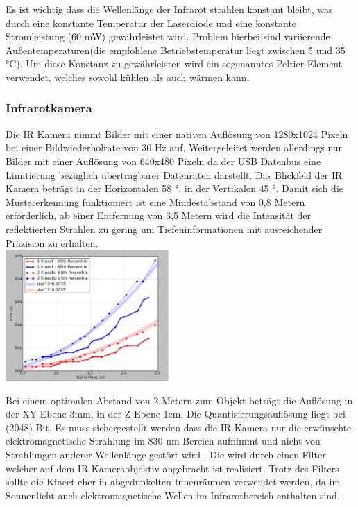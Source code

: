 Es ist wichtig dass die Wellenlänge der Infrarot strahlen konstant bleibt, was durch eine konstante Temperatur der Laserdiode und eine konstante Stromleistung (60 mW) gewährleistet wird. Problem hierbei sind variierende Außentemperaturen(die empfohlene Betriebstemperatur  liegt zwischen 5 und 35 °C). Um diese Konstanz zu gewährleisten wird ein sogenanntes  Peltier-Element verwendet, welches sowohl kühlen als auch wärmen kann.\\

\subsubsection{Infrarotkamera}


Die IR Kamera nimmt Bilder mit einer nativen Auflösung von 1280x1024 Pixeln bei einer Bildwiederholrate von 30 Hz auf. Weitergeleitet werden allerdings nur Bilder mit einer Auflösung von 640x480 Pixeln da der USB Datenbus eine Limitierung bezüglich übertragbarer Datenraten darstellt. Das Blickfeld der IR Kamera beträgt in der Horizontalen 58 °, in der Vertikalen 45 °. Damit sich die Mustererkennung funktioniert ist eine Mindestabstand von 0,8 Metern erforderlich, ab einer Entfernung von 3,5 Metern wird die Intensität der reflektierten Strahlen zu gering um Tiefeninformationen mit ausreichender Präzision zu erhalten.\\

\includegraphics[height=5cm]{Res/Res_to_Dist.png}

Bei einem optimalen Abstand von 2 Metern zum Objekt beträgt die Auflösung in der XY Ebene 3mm, in der Z Ebene 1cm.
Die Quantisierungsauflösung liegt bei  (2048) Bit.
Es muss sichergestellt werden dass die IR Kamera nur die erwünschte elektromagnetische Strahlung im 830 nm Bereich aufnimmt und nicht von Strahlungen anderer Wellenlänge gestört wird . Die wird durch einen Filter welcher auf dem IR Kameraobjektiv angebracht ist realisiert.
Trotz des Filters sollte die Kinect eher in abgedunkelten Innenräumen verwendet werden, da im Sonnenlicht auch elektromagnetische Wellen im Infrarotbereich enthalten sind.\\

